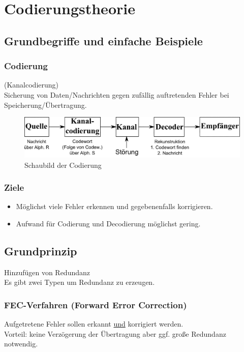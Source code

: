 \chapter{Codierungstheorie}

\section{Grundbegriffe und einfache Beispiele}

\subsection{Codierung} (Kanalcodierung)\\
Sicherung von Daten/Nachrichten gegen zuf\"allig auftretenden Fehler bei Speicherung/\"Ubertragung.\\
\begin{figure}[h]
	\centering
	\includegraphics[width=15cm]{./img/codierung_schaubild.png}
	\caption{Schaubild der Codierung}
	\label{img:Schaubild Codierung}
\end{figure}

\subsection{Ziele}
\begin{itemize}
	\item M\"oglichst viele Fehler erkennen und gegebenenfalls korrigieren. %
	\item Aufwand f\"ur Codierung und Decodierung m\"oglichst gering.
\end{itemize}

\section{Grundprinzip}
Hinzuf\"ugen von Redundanz
\\
Es gibt zwei Typen um Redundanz zu erzeugen.
\subsection{FEC-Verfahren (Forward Error Correction)}
Aufgetretene Fehler sollen erkannt \underline{und} korrigiert werden.\\
Vorteil: keine Verz\"ogerung der \"Ubertragung aber ggf. gro\ss e Redundanz notwendig.

